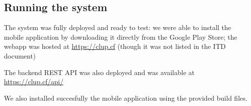 \subsection{Running the system}

The system was fully deployed and ready to test: we were able to install the mobile application by downloading it directly from the Google Play Store; the webapp was hosted at \href{https://clup.cf}{https://clup.cf} (though it was not listed in the ITD document)

The backend REST API was also deployed and was available at \href{https://clup.cf/api/}{https://clup.cf/api/}

We also installed succesfully the mobile application using the provided build files.



